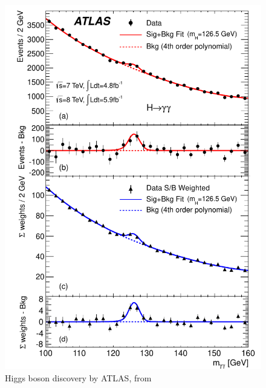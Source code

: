 \documentclass{beamer}
\begin{document}
\begin{frame}
\begin{columns}
			\begin{figure}
				\includegraphics[width=0.75\columnwidth]{figures/higgs_discovery.pdf}
				\caption{Higgs boson discovery by ATLAS, from \cite{atlas_collaboration_observation_2012}}
			\end{figure}
		\end{columns}
	\end{frame}
\end{document}
